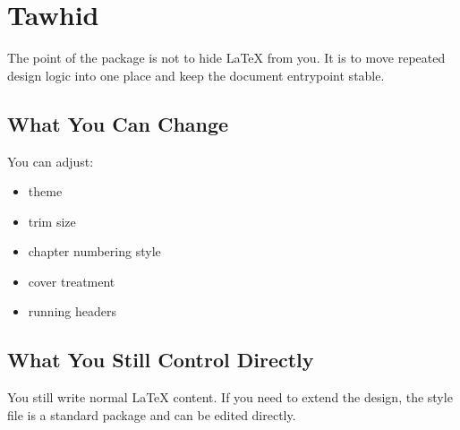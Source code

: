 \chapter{Tawhid}

The point of the package is not to hide LaTeX from you. It is to move repeated
design logic into one place and keep the document entrypoint stable.

\section{What You Can Change}

You can adjust:

\begin{itemize}
  \item theme
  \item trim size
  \item chapter numbering style
  \item cover treatment
  \item running headers
\end{itemize}

\section{What You Still Control Directly}

You still write normal LaTeX content. If you need to extend the design, the
style file is a standard package and can be edited directly.
